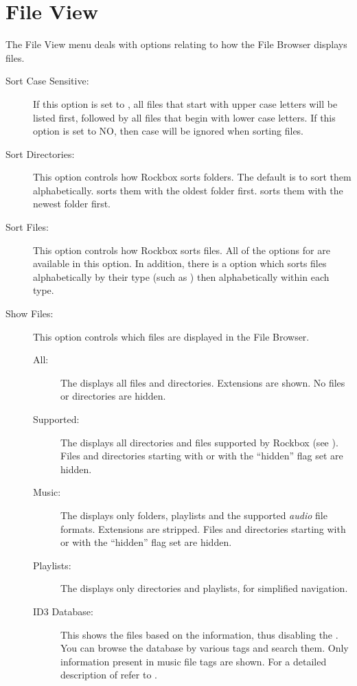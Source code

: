 \section{File View}
The File View menu deals with options relating to how the File Browser 
displays files.
%
\begin{description}
\item[Sort Case Sensitive:]
  If this option is set to , all files that start with upper case 
  letters will be listed first, followed by all files that begin with lower 
  case letters.  If this option is set to NO, then case will be ignored when 
  sorting files.
\item[Sort Directories:]
  This option controls how Rockbox sorts folders.  The default is to sort 
  them alphabetically.  sorts them with the oldest folder first. 
   sorts them with the newest folder first.
  
\item[Sort Files:]
  This option controls how Rockbox sorts files.  All of the options for 
   are available in this option.  In addition, there 
  is a  option which sorts files alphabetically by their type 
  (such as ) then alphabetically within each type.
  
\item[\label{ref:ShowFiles}Show Files:]
  This option controls which files are displayed in the File Browser.
  \begin{description}
  \item[All:] The  displays all files and directories.
    Extensions are shown. No files or directories are hidden.
  \item[Supported:] The  displays all directories and
    files supported by Rockbox (see ).
    Files and directories starting with  or with the ``hidden''
    flag set are hidden.
  \item[Music:] The  displays only folders, playlists and
    the supported \emph{audio} file formats. Extensions are stripped. Files and
    directories starting with  or with the ``hidden'' flag set are
    hidden.
  \item[Playlists:] The  displays only directories and playlists,
    for simplified navigation.
  \item[ID3 Database:] This shows the files based on the 
    information, thus disabling the . You can browse the
    database by various tags and search them. Only information present
    in music file tags are shown. For a detailed description of
     refer to .


\end{description}
\end{description}
